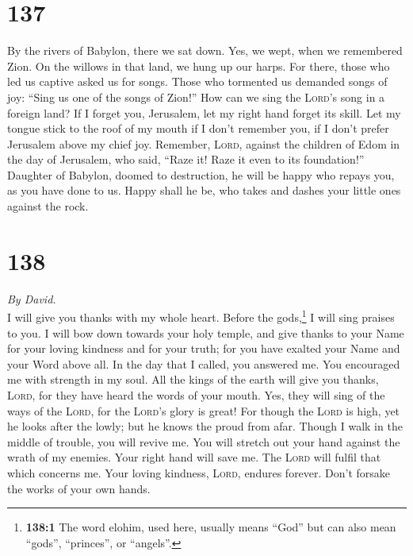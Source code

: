 \hypertarget{section-136}{%
\section{137}\label{section-136}}

 By the rivers of Babylon, there we sat down. Yes, we
wept, when we remembered Zion.  On the willows in that
land, we hung up our harps.  For there, those who led us
captive asked us for songs. Those who tormented us demanded songs of
joy: ``Sing us one of the songs of Zion!''  How can we
sing the \textsc{Lord}'s song in a foreign land?  If I
forget you, Jerusalem, let my right hand forget its skill.
 Let my tongue stick to the roof of my mouth if I don't
remember you, if I don't prefer Jerusalem above my chief joy.
 Remember, \textsc{Lord}, against the children of Edom in
the day of Jerusalem, who said, ``Raze it! Raze it even to its
foundation!''  Daughter of Babylon, doomed to destruction,
he will be happy who repays you, as you have done to us. 
Happy shall he be, who takes and dashes your little ones against the
rock.

\hypertarget{section-137}{%
\section{138}\label{section-137}}

\emph{By David.}\\
 I will give you thanks with my whole heart. Before the
gods,\footnote{\textbf{138:1} The word elohim, used here, usually means
  ``God'' but can also mean ``gods'', ``princes'', or ``angels''.} I
will sing praises to you.  I will bow down towards your
holy temple, and give thanks to your Name for your loving kindness and
for your truth; for you have exalted your Name and your Word above all.
 In the day that I called, you answered me. You encouraged
me with strength in my soul.  All the kings of the earth
will give you thanks, \textsc{Lord}, for they have heard the words of
your mouth.  Yes, they will sing of the ways of the
\textsc{Lord}, for the \textsc{Lord}'s glory is great! 
For though the \textsc{Lord} is high, yet he looks after the lowly; but
he knows the proud from afar.  Though I walk in the middle
of trouble, you will revive me. You will stretch out your hand against
the wrath of my enemies. Your right hand will save me. 
The \textsc{Lord} will fulfil that which concerns me. Your loving
kindness, \textsc{Lord}, endures forever. Don't forsake the works of
your own hands.

